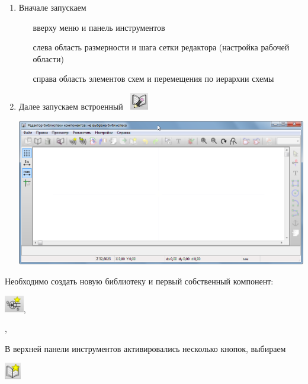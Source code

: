 \begin{enumerate}
  \item Вначале запускаем 
  \begin{itemize}
    \item[вверху] меню и панель инструментов
    \item[слева] область размерности и шага сетки редактора (настройка рабочей
    области)
    \item[справа] область элементов схем и перемещения по иерархии схемы
  \end{itemize}
  \item Далее запускаем встроенный
  \ \includegraphics[height=2em]{kicad/ee22.png}

\includegraphics[height=0.5\textheight]{kicad/lib23.png}
\end{enumerate}

Необходимо создать новую библиотеку и первый собственный компонент:

\includegraphics[height=2em]{kicad/newel.png},

,




\bigskip

В верхней панели инструментов активировались несколько кнопок, выбираем

\includegraphics[height=2em]{kicad/lib26.png}

